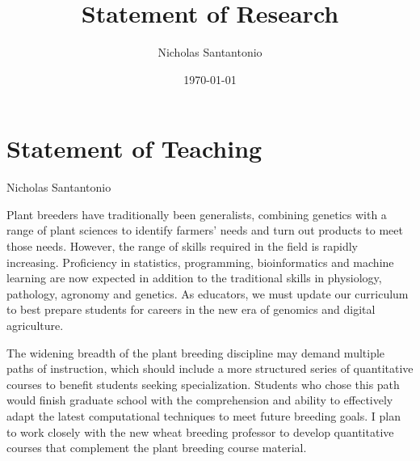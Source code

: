 \documentclass[11pt]{article}
\title{Statement of Research}
\author{Nicholas Santantonio}
\date{\today}
\begin{document}
\section*{\centering Statement of Teaching}
\begin{center} Nicholas Santantonio \end{center}

\noindent Plant breeders have traditionally been generalists, combining genetics with a range of plant sciences to identify farmers' needs and turn out products to meet those needs. However, the range of skills required in the field is rapidly increasing. Proficiency in statistics, programming, bioinformatics and machine learning are now expected in addition to the traditional skills in physiology, pathology, agronomy and genetics. As educators, we must update our curriculum to best prepare students for careers in the new era of genomics and digital agriculture. 

The widening breadth of the plant breeding discipline may demand multiple paths of instruction, which should include a more structured series of quantitative courses to benefit students seeking specialization. Students who chose this path would finish graduate school with the comprehension and ability to effectively adapt the latest computational techniques to meet future breeding goals. I plan to work closely with the new wheat breeding professor to develop quantitative courses that complement the plant breeding course material.%



\end{document}
